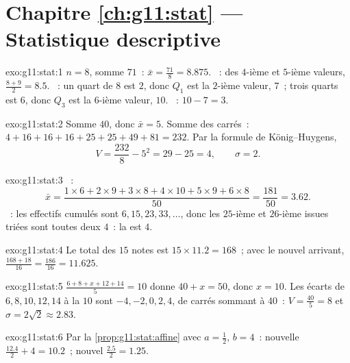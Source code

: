 \section*{Chapitre \ref{ch:g11:stat} --- Statistique descriptive}

\begin{solution}{exo:g11:stat:1}
$n = 8$, somme $71$~:  $\bar x = \frac{71}{8} = 8.875$. ~:
 des $4$-ième et $5$-ième valeurs, $\frac{8 + 9}{2} = 8.5$.
~: un quart de $8$ est $2$, donc $Q_1$ est la $2$-ième
valeur, $7$~; trois quarts est $6$, donc $Q_3$ est la $6$-ième valeur,
$10$. ~: $10 - 7 = 3$.
\end{solution}

\begin{solution}{exo:g11:stat:2}
Somme $40$, donc $\bar x = 5$. Somme des carrés~:
$4 + 16 + 16 + 16 + 25 + 25 + 49 + 81 = 232$. Par la formule de
König--Huygens,
\[
V = \frac{232}{8} - 5^2 = 29 - 25 = 4,
\qquad
\sigma = 2 .
\]
\end{solution}

\begin{solution}{exo:g11:stat:3}
~:
\[
\bar x = \frac{1 \times 6 + 2 \times 9 + 3 \times 8 + 4 \times 10
+ 5 \times 9 + 6 \times 8}{50}
= \frac{181}{50} = 3.62 .
\]
~: les effectifs cumulés sont $6, 15, 23, 33, \dots$, donc les
$25$-ième et $26$-ième issues triées sont toutes deux $4$~: la 
est $4$.
\end{solution}

\begin{solution}{exo:g11:stat:4}
Le total des $15$ notes est $15 \times 11.2 = 168$~; avec le nouvel
arrivant, $\frac{168 + 18}{16} = \frac{186}{16} = 11.625$.
\end{solution}

\begin{solution}{exo:g11:stat:5}
$\frac{6 + 8 + x + 12 + 14}{5} = 10$ donne $40 + x = 50$, donc
$x = 10$. Les écarts de $6, 8, 10, 12, 14$ à la  $10$ sont
$-4, -2, 0, 2, 4$, de carrés sommant à $40$~:
$V = \frac{40}{5} = 8$ et $\sigma = 2\sqrt2 \approx 2.83$.
\end{solution}

\begin{solution}{exo:g11:stat:6}
Par la \cref{prop:g11:stat:affine} avec $a = \frac12$, $b = 4$~: nouvelle
 $\frac{12.4}{2} + 4 = 10.2$~; nouvel 
$\frac{2.5}{2} = 1.25$.
\end{solution}

